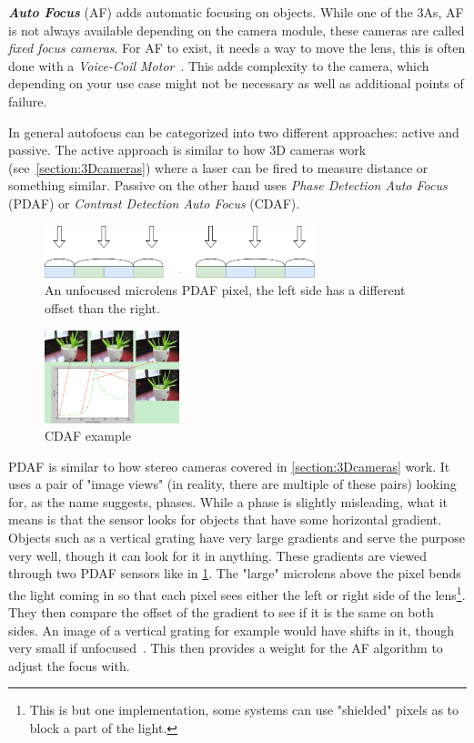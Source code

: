\textit{\textbf{Auto Focus}} (AF)  adds automatic focusing on objects. While
one of the 3As, AF is not always available depending on the camera module, these
cameras are called \textit{fixed focus cameras}. For AF to exist, it needs a way to move
the lens, this is often done with a \textit{Voice-Coil Motor}~\cite{coilmotor2007}.
This adds complexity to the camera, which depending on your use case might not be
necessary as well as additional points of failure.

In general autofocus can be categorized into two different approaches: active
and passive. The active approach is similar to how 3D cameras work
(see~\cref{section:3Dcameras}) where a laser can be fired to measure distance
or something similar. Passive on the other hand uses \textit{Phase Detection
Auto Focus} (PDAF) or \textit{Contrast Detection Auto Focus} (CDAF).

\begin{figure}
    \centering
        \includegraphics[width=0.7\textwidth]{figures/pdaf_sensor.png}
        \caption{An unfocused microlens PDAF pixel, the left side has a
        different offset than the right.}
        \label{fig:pdaf}
\end{figure}

\pagebreak
\begin{figure}
    \begin{center}
        \includegraphics[width=0.35\textwidth]{figures/cdaf.png}
    \end{center}
    \caption{CDAF example~\cite{xu2011robust}}\label{fig:cdaf}
\end{figure}
PDAF is similar to how stereo cameras covered in \cref{section:3Dcameras}
work. It uses a pair of "image views" (in reality, there are multiple of these pairs)
looking for, as the name suggests, phases. While a phase is slightly
misleading, what it means is that the sensor looks for objects that have some
horizontal gradient. Objects such as a vertical grating have very large
gradients and serve the purpose very well, though it can look for it in
anything. These gradients are viewed through two PDAF sensors like in
\cref{fig:pdaf}. The "large" microlens above the pixel bends the light coming
in so that each pixel sees either the left or right side of the
lens\footnote{This is but one implementation, some systems can use "shielded"
pixels as to block a part of the light.}. They then compare the offset of the
gradient to see if it is the same on both sides. An image of a vertical
grating for example would have shifts in it, though very small if unfocused~\cite{pdafPatent}.
This then provides a weight for the AF algorithm to adjust the focus with.


